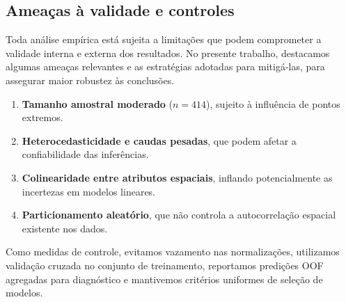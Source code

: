 \subsection{Ameaças à validade e controles}
Toda análise empírica está sujeita a limitações que podem comprometer a validade interna e externa dos resultados. No presente trabalho, destacamos algumas ameaças relevantes e as estratégias adotadas para mitigá-las, para assegurar maior robustez às conclusões.  

\begin{enumerate}
    \item \textbf{Tamanho amostral moderado} (\(n=414\)), sujeito à influência de pontos extremos.
    \item \textbf{Heterocedasticidade e caudas pesadas}, que podem afetar a confiabilidade das inferências.
    \item \textbf{Colinearidade entre atributos espaciais}, inflando potencialmente as incertezas em modelos lineares.
    \item \textbf{Particionamento aleatório}, que não controla a autocorrelação espacial existente nos dados.
\end{enumerate}

Como medidas de controle, evitamos vazamento nas normalizações, utilizamos validação cruzada no conjunto de treinamento, reportamos predições OOF agregadas para diagnóstico e mantivemos critérios uniformes de seleção de modelos.
